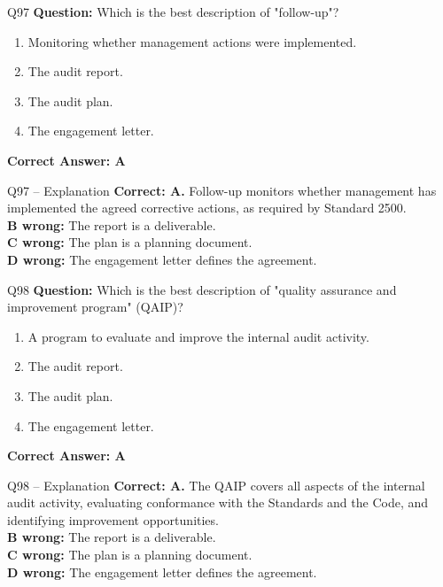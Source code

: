 \documentclass[aspectratio=169,10pt]{beamer}
\begin{document}
	\begin{frame}[t]{Q97}
		\small
		\textbf{Question:} Which is the best description of "follow-up"?
		\begin{enumerate}[label=\Alph*.,itemsep=1pt,topsep=2pt]
			\item Monitoring whether management actions were implemented.
			\item The audit report.
			\item The audit plan.
			\item The engagement letter.
		\end{enumerate}
		\vspace{4pt}
		\textbf{Correct Answer: A}
	\end{frame}
	
	\begin{frame}[t]{Q97 -- Explanation}
		\small
		\textbf{Correct: A.} Follow-up monitors whether management has implemented the agreed corrective actions, as required by Standard 2500. \\[4pt]
		\textbf{B wrong:} The report is a deliverable. \\[2pt]
		\textbf{C wrong:} The plan is a planning document. \\[2pt]
		\textbf{D wrong:} The engagement letter defines the agreement.
	\end{frame}
	
	\begin{frame}[t]{Q98}
		\small
		\textbf{Question:} Which is the best description of "quality assurance and improvement program" (QAIP)?
		\begin{enumerate}[label=\Alph*.,itemsep=1pt,topsep=2pt]
			\item A program to evaluate and improve the internal audit activity.
			\item The audit report.
			\item The audit plan.
			\item The engagement letter.
		\end{enumerate}
		\vspace{4pt}
		\textbf{Correct Answer: A}
	\end{frame}
	
	\begin{frame}[t]{Q98 -- Explanation}
		\small
		\textbf{Correct: A.} The QAIP covers all aspects of the internal audit activity, evaluating conformance with the Standards and the Code, and identifying improvement opportunities. \\[4pt]
		\textbf{B wrong:} The report is a deliverable. \\[2pt]
		\textbf{C wrong:} The plan is a planning document. \\[2pt]
		\textbf{D wrong:} The engagement letter defines the agreement.
	\end{frame}
	
\end{document}
